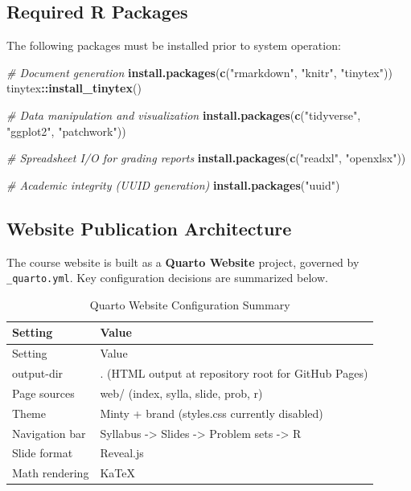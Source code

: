 \documentclass[
]{article}
\newenvironment{Shaded}{\begin{snugshade}}{\end{snugshade}}
\newcommand{\CommentTok}[1]{\textcolor[rgb]{0.56,0.35,0.01}{\textit{#1}}}
\newcommand{\FunctionTok}[1]{\textcolor[rgb]{0.13,0.29,0.53}{\textbf{#1}}}
\newcommand{\NormalTok}[1]{#1}
\newcommand{\SpecialCharTok}[1]{\textcolor[rgb]{0.81,0.36,0.00}{\textbf{#1}}}
\newcommand{\StringTok}[1]{\textcolor[rgb]{0.31,0.60,0.02}{#1}}
\begin{document}
\subsection{Required R Packages}\label{required-r-packages}

The following packages must be installed prior to system operation:

\begin{Shaded}
\begin{Highlighting}[]
\CommentTok{\# Document generation}
\FunctionTok{install.packages}\NormalTok{(}\FunctionTok{c}\NormalTok{(}\StringTok{"rmarkdown"}\NormalTok{, }\StringTok{"knitr"}\NormalTok{, }\StringTok{"tinytex"}\NormalTok{))}
\NormalTok{tinytex}\SpecialCharTok{::}\FunctionTok{install\_tinytex}\NormalTok{()}

\CommentTok{\# Data manipulation and visualization}
\FunctionTok{install.packages}\NormalTok{(}\FunctionTok{c}\NormalTok{(}\StringTok{"tidyverse"}\NormalTok{, }\StringTok{"ggplot2"}\NormalTok{, }\StringTok{"patchwork"}\NormalTok{))}

\CommentTok{\# Spreadsheet I/O for grading reports}
\FunctionTok{install.packages}\NormalTok{(}\FunctionTok{c}\NormalTok{(}\StringTok{"readxl"}\NormalTok{, }\StringTok{"openxlsx"}\NormalTok{))}

\CommentTok{\# Academic integrity (UUID generation)}
\FunctionTok{install.packages}\NormalTok{(}\StringTok{"uuid"}\NormalTok{)}
\end{Highlighting}
\end{Shaded}

\subsection{Website Publication
Architecture}\label{website-publication-architecture}

The course website is built as a \textbf{Quarto Website} project,
governed by \texttt{\_quarto.yml}. Key configuration decisions are
summarized below.

\begin{longtable}[]{@{}ll@{}}
\caption{Quarto Website Configuration Summary}\tabularnewline
\toprule\noalign{}
Setting & Value \\
\midrule\noalign{}
\endfirsthead
\toprule\noalign{}
Setting & Value \\
\midrule\noalign{}
\endhead
\bottomrule\noalign{}
\endlastfoot
output-dir & . (HTML output at repository root for GitHub Pages) \\
Page sources & web/ (index, sylla, slide, prob, r) \\
Theme & Minty + brand (styles.css currently disabled) \\
Navigation bar & Syllabus -\textgreater{} Slides -\textgreater{} Problem
sets -\textgreater{} R \\
Slide format & Reveal.js \\
Math rendering & KaTeX \\
\end{longtable}
\end{document}
